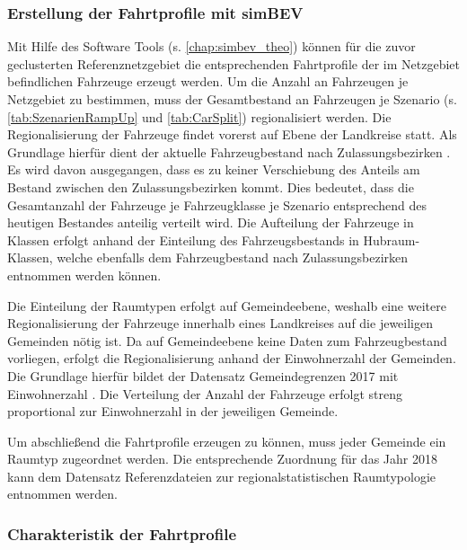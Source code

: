 \subsubsection{Erstellung der Fahrtprofile mit simBEV}

Mit Hilfe des Software Tools \simbev (s. \autoref{chap:simbev_theo}) können für die zuvor geclusterten Referenznetzgebiet die entsprechenden Fahrtprofile der im Netzgebiet befindlichen Fahrzeuge erzeugt werden.
Um die Anzahl an Fahrzeugen je Netzgebiet zu bestimmen, muss der Gesamtbestand an Fahrzeugen je Szenario (s. \autoref{tab:SzenarienRampUp} und \autoref{tab:CarSplit}) regionalisiert werden.
Die Regionalisierung der Fahrzeuge findet vorerst auf Ebene der Landkreise statt.
Als Grundlage hierfür dient der aktuelle Fahrzeugbestand nach Zulassungsbezirken \cite[][Stand: ]{KBAPLZ2020}.
Es wird davon ausgegangen, dass es zu keiner Verschiebung des Anteils am Bestand zwischen den Zulassungsbezirken kommt.
Dies bedeutet, dass die Gesamtanzahl der Fahrzeuge je Fahrzeugklasse je Szenario entsprechend des heutigen Bestandes anteilig verteilt wird.
Die Aufteilung der Fahrzeuge in Klassen erfolgt anhand der Einteilung des Fahrzeugsbestands in Hubraum-Klassen, welche ebenfalls dem Fahrzeugbestand nach Zulassungsbezirken entnommen werden können.\medskip

Die Einteilung der \Regiostar Raumtypen erfolgt auf Gemeindeebene, weshalb eine weitere Regionalisierung der Fahrzeuge innerhalb eines Landkreises auf die jeweiligen Gemeinden nötig ist.
Da auf Gemeindeebene keine Daten zum Fahrzeugbestand vorliegen, erfolgt die Regionalisierung anhand der Einwohnerzahl der Gemeinden.
Die Grundlage hierfür bildet der Datensatz \glqq Gemeindegrenzen 2017 mit Einwohnerzahl\grqq{} \cite[][Stand: ]{EDG2020}.
Die Verteilung der Anzahl der Fahrzeuge erfolgt streng proportional zur Einwohnerzahl in der jeweiligen Gemeinde.\medskip

Um abschließend die Fahrtprofile erzeugen zu können, muss jeder Gemeinde ein \Regiostar Raumtyp zugeordnet werden.
Die entsprechende Zuordnung für das Jahr \num{2018} kann dem Datensatz \glqq Referenzdateien zur regionalstatistischen Raumtypologie\grqq{} \cite[][Stand: ]{BMVIa2020} entnommen werden.


\subsubsection{Charakteristik der Fahrtprofile}

